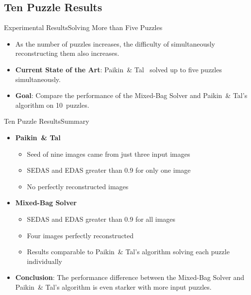 \documentclass[handout,10pt]{beamer}  %
\newcommand{\backupend}{
   \setcounter{framenumber}{\value{finalframe}}
}
\begin{document}
\subsection{Ten Puzzle Results}
\begin{frame}{Experimental Results}{Solving More than Five Puzzles}
  \begin{itemize}
	  \item<1-> As the number of puzzles increases, the difficulty of simultaneously reconstructing them also increases.
	  \vfill  
  	\item<2-> \textbf{Current State of the Art}: Paikin~\& Tal~\cite{paikin2015} solved up to five puzzles simultaneously.
	  \vfill
  	\item<3-> \textbf{Goal}: Compare the performance of the Mixed-Bag Solver and Paikin~\& Tal's algorithm on 10~puzzles.
  \end{itemize}
\end{frame}


\begin{frame}{Ten Puzzle Results}{Summary}
  	\begin{itemize}
  		\item<1-> \textbf{Paikin~\& Tal}
  		\begin{itemize}
  		  \setlength\itemsep{0.7em}
			  \item Seed of nine images came from just three input images
			  \item SEDAS and EDAS greater than 0.9 for only one image
			  \item No perfectly reconstructed images
		  \end{itemize}
		  \vfill
  	  \item<2-> \textbf{Mixed-Bag Solver}
		  \begin{itemize}
		    \setlength\itemsep{0.7em}
			  \item SEDAS and EDAS greater than 0.9 for all images
			  \item Four images perfectly reconstructed
			  \item Results comparable to Paikin~\& Tal's algorithm solving each puzzle individually
		  \end{itemize}	
		  \vfill
  		\item<3-> \textbf{Conclusion}: The performance difference between the Mixed-Bag Solver and Paikin~\& Tal's algorithm is even starker with more input puzzles.
  \end{itemize}
\end{frame}





\backupend
\end{document}
